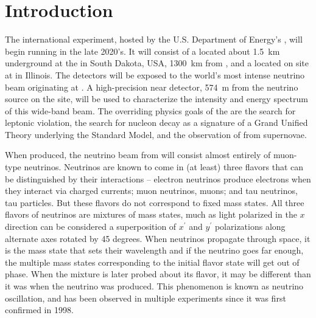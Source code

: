 \documentclass[../main-v1.tex]{subfiles}
\begin{document}
\section{Introduction }\label{sec:intro-introduction}

The international  experiment, hosted by the U.S. Department of Energy's ,  will begin running in the late 2020's. It will consist of a  located about \SI{1.5}{km} underground at the  in South Dakota, USA, \SI{1300}{\km} from , and a  located on site at  in Illinois. The  detectors will be exposed to the world's most intense neutrino beam originating at . A high-precision near detector, \SI{574}{m} from the neutrino source on the  site, will be used to characterize the intensity and energy spectrum of this wide-band beam. The overriding physics goals of the  are the search for leptonic  violation, the search for nucleon decay as a signature of a Grand Unified Theory underlying the Standard Model, and the observation of   from supernovae.


When produced, the neutrino beam from  will consist almost entirely of muon-type neutrinos. %
Neutrinos are known to come in (at least) three flavors that can be distinguished by their interactions -- electron %
neutrinos produce electrons when they interact via charged currents; muon neutrinos, muons; and tau neutrinos, tau particles.  But these flavors do not correspond to fixed mass states.  All three flavors of neutrinos are mixtures of mass states, much as  light polarized in the $x$ direction  can be considered a superposition of  $x^\prime$ and $y^\prime$ polarizations along  alternate axes rotated by 45 degrees.  When neutrinos propagate through space, it is the mass state that sets their wavelength and if the neutrino goes far enough, the multiple mass states  corresponding to the initial flavor state will get out of phase.  When the mixture is later probed about its flavor, it may be different than it was when the neutrino was produced. %
This phenomenon is known as neutrino oscillation, and has been %
observed in multiple experiments since it was first confirmed in 1998\cite{Kajita2006}.
\end{document}
